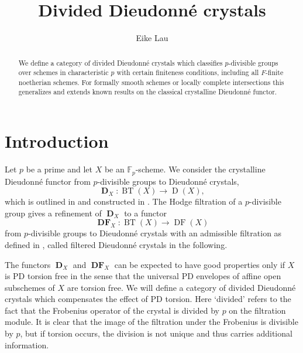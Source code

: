 \documentclass[a4paper,11pt]{article}
\theoremstyle{plain}
\theoremstyle{definition}
\theoremstyle{remark}
\theoremstyle{definition}
\numberwithin{Lemma}{section}
\numberwithin{Subpoint}{Lemma}
\numberwithin{equation}{section}
\newcommand{\DD}{{\mathbb{D}}}
\newcommand{\FF}{{\mathbb{F}}}
\DeclareMathOperator{\BT}{BT}
\DeclareMathOperator{\Dcat}{D}
\DeclareMathOperator{\Dfun}{\mathbf D} %
\DeclareMathOperator{\DFcat}{DF}
\DeclareMathOperator{\DFfun}{\mathbf{DF}} %
\newcommand{\chang}[1]{{#1}}
\begin{document}
\title{Divided Dieudonn\'e crystals}
\author{Eike Lau}

\begingroup
\renewcommand{\thefootnote}{}
\endgroup

\maketitle

\begin{abstract}
We define a category of divided Dieudonn\'e crystals which classifies $p$-divisible groups over schemes in characteristic $p$ with certain finiteness conditions, including all $F$-finite noetherian schemes. For formally smooth schemes or locally complete intersections this generalizes and extends known results on the classical crystalline Dieudonn\'e functor.
\end{abstract}

\setcounter{tocdepth}{1}
\tableofcontents

\section{Introduction}

\begingroup

\chang
{Let $p$ be a prime and let $X$ be an $\FF_p$-scheme. We}
consider the crystalline Dieudonn\'e functor 
from $p$-divisible groups to Dieudonn\'e crystals,
\[
\Dfun_X:\BT(X)\to\Dcat(X),
\]
which is outlined in \cite{Grothendieck:Nice, Grothendieck:Montreal}
and constructed in \cite{Mazur-Messing, BBM}.
The Hodge filtration of a $p$-divisible group 
gives a refinement of $\Dfun_X$ to a functor
\[
\DFfun_X:\BT(X)\to\DFcat(X)
\]
from $p$-divisible groups
to Dieudonn\'e crystals with an admissible filtration as defined
in \cite{Grothendieck:Montreal}, called filtered Dieudonn\'e crystals
in the following.

The functors $\Dfun_X$ and $\DFfun_X$ can be expected to have good properties 
only if $X$ is PD torsion free in the sense that
the universal PD envelopes of affine open subschemes of $X$ are torsion free.
We will define a category of divided Dieudonn\'e crystals 
which compensates the effect of PD torsion.
Here `divided' refers to the fact that 
the Frobenius operator of the crystal is divided by $p$ on the filtration module.
It is clear that the image of the filtration under the Frobenius 
is divisible by $p$, but if torsion occurs, 
the division is not unique and thus
carries additional information.
\end{document}
